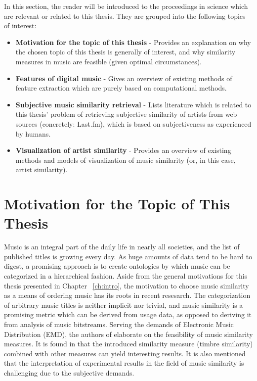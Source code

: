 In this section, the reader will be introduced to the proceedings in science which are
relevant or related to this thesis. They are grouped into the following topics of interest:

\begin{itemize}
	\item \textbf {Motivation for the topic of this thesis} - Provides an explanation on why the chosen topic of this thesis is generally of interest, and why similarity measures in music are feasible (given optimal circumstances).
	\item \textbf {Features of digital music} - Gives an overview of existing methods of feature extraction which are purely based on computational methods.
	\item \textbf {Subjective music similarity retrieval} - Lists literature which is related to this thesis' problem of retrieving subjective similarity of artists from web sources (concretely: Last.fm), which is based on subjectiveness as experienced by humans.
	\item \textbf {Visualization of artist similarity} - Provides an overview of existing methods and models of visualization of music similarity (or, in this case, artist similarity).
\end{itemize}

\section{Motivation for the Topic of This Thesis}

Music is an integral part of the daily life in nearly all societies, and the list of published titles is growing every day. As huge amounts of data tend to be hard to digest, a promising approach is to create ontologies by which music can be categorized in a hierarchical fashion. Aside from the general motivations for this thesis presented in Chapter ~\ref{ch:intro}, the motivation to choose music similarity as a means of ordering music has its roots in recent resesarch. The categorization of arbitrary music titles is neither implicit nor trivial, and music similarity is a promising metric which can be derived from usage data, as opposed to deriving it from analysis of music bitstreams. Serving the demands of Electronic Music Distribution (EMD), the authors of \cite{pachet:02g} elaborate on the feasibility of music similarity measures. It is found in \cite{pachet:02g} that the introduced similarity measure (timbre similarity) combined with other measures can yield interesting results. It is also mentioned that the interpretation of experimental results in the field of music similarity is challenging due to the subjective demands. 

